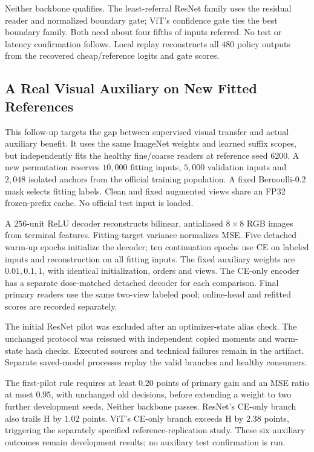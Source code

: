 Neither backbone qualifies. The least-referral ResNet family uses the residual
reader and normalized boundary gate; ViT's confidence gate ties the best
boundary family. Both need about four fifths of inputs referred. No test or
latency confirmation follows. Local replay reconstructs all $480$ policy
outputs from the recovered cheap/reference logits and gate scores.

\subsection{A Real Visual Auxiliary on New Fitted References}\label{app:vision_auxiliary_new}

This follow-up targets the gap between supervised visual transfer and actual
auxiliary benefit. It uses the same ImageNet weights and learned suffix scopes,
but independently fits the healthy fine/coarse readers at reference seed $6200$.
A new permutation reserves $10{,}000$ fitting inputs, $5{,}000$ validation inputs
and $2{,}048$ isolated anchors from the official training population. A fixed
Bernoulli-$0.2$ mask selects fitting labels. Clean and fixed augmented views
share an FP32 frozen-prefix cache. No official test input is loaded.

A $256$-unit ReLU decoder reconstructs bilinear, antialiased $8\times8$ RGB
images from terminal features. Fitting-target variance normalizes MSE. Five
detached warm-up epochs initialize the decoder; ten continuation epochs use
CE on labeled inputs and reconstruction on all fitting inputs. The fixed
auxiliary weights are $0.01,0.1,1$, with identical initialization, orders and
views. The CE-only encoder has a separate dose-matched detached decoder for
each comparison. Final primary readers use the same two-view labeled pool;
online-head and refitted scores are recorded separately.

The initial ResNet pilot was excluded after an optimizer-state alias check.
The unchanged protocol was reissued with independent copied moments and
warm-state hash checks. Executed sources and technical failures remain in the
artifact. Separate saved-model processes replay the valid branches and healthy
consumers.



The first-pilot rule requires at least $0.20$ points of primary gain and an MSE
ratio at most $0.95$, with unchanged old decisions, before extending a weight
to two further development seeds. Neither backbone passes. ResNet's CE-only
branch also trails H by $1.02$ points. ViT's CE-only branch exceeds H by $2.38$
points, triggering the separately specified reference-replication study.
These six auxiliary outcomes remain development results; no auxiliary test
confirmation is run.

